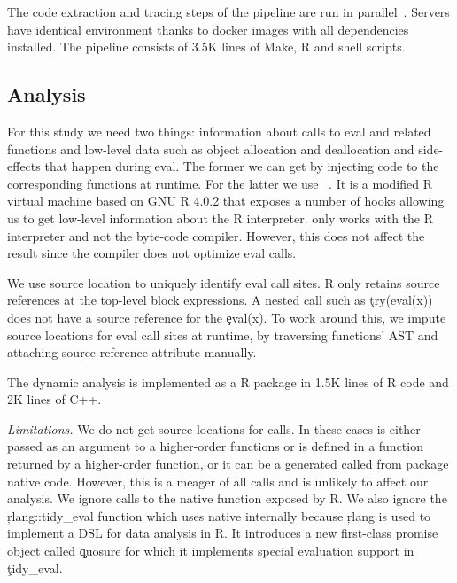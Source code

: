 \documentclass[screen,acmsmall]{acmart}
\newcommand{\mypara}[1]{\medskip\noindent\emph{#1}\xspace}
\begin{document}
\medskip\noindent
The code extraction and tracing steps of the pipeline are run in
parallel~\cite{GNUparallel}. Servers have identical environment thanks to docker
images with all dependencies installed. The pipeline consists of 3.5K lines of
Make, R and shell scripts.

\subsection{Analysis}

For this study we need two things: information about calls to eval and related
functions and low-level data such as object allocation and deallocation and
side-effects that happen during eval. The former we can get by injecting code to
the corresponding functions at runtime. For the latter we use
\rdyntrace~\cite{oopsla19a}. It is a modified R virtual machine based on GNU R
4.0.2 that exposes a number of hooks allowing us to get low-level information
about the R interpreter. \rdyntrace only works with the R interpreter and not
the byte-code compiler. However, this does not affect the result since the
compiler does not optimize eval calls.

We use source location to uniquely identify eval call sites. R only retains
source references at the top-level block expressions. A nested call such as
\c{try(eval(x))} does not have a source reference for the \c{eval(x)}. To work
around this, we impute source locations for eval call sites at runtime, by
traversing functions' AST and attaching source reference attribute manually.

The dynamic analysis is implemented as a R package in 1.5K lines of R code and
2K lines of C++.

\mypara{Limitations.} We do not get source locations for \CranUndefinedRnd \eval
calls. In these cases \eval is either passed as an argument to a higher-order
functions or is defined in a function returned by a higher-order function, or it
can be a generated called from package native code. However, this is a meager
\CranUndefinedRatio of all \eval calls and is unlikely to affect our analysis.
We ignore calls to the native \eval function exposed by R. We also ignore the
\c{rlang::tidy\_eval} function which uses native \eval internally because
\c{rlang} is used to implement a DSL for data analysis in R. It introduces a new
first-class promise object called \c{quosure} for which it implements special
evaluation support in \c{tidy\_eval}.

\end{document}
